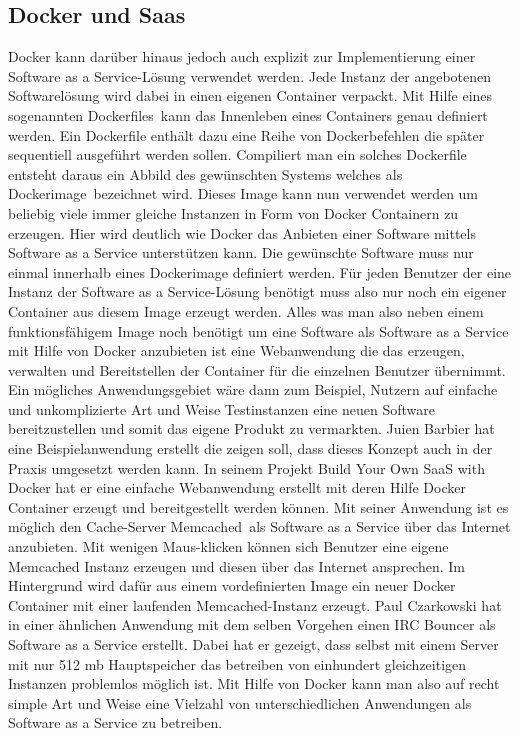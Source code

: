 \subsection{Docker und Saas}
\label{sec:docker_und_saas}
Docker kann darüber hinaus jedoch auch explizit zur Implementierung einer Software as a Service-Lösung verwendet werden. Jede Instanz der angebotenen Softwarelösung wird dabei in einen eigenen Container verpackt. Mit Hilfe eines sogenannten \grq Dockerfiles\grq\ kann das Innenleben eines Containers genau definiert werden. Ein Dockerfile enthält dazu eine Reihe von Dockerbefehlen die später sequentiell ausgeführt werden sollen. Compiliert man ein solches Dockerfile entsteht daraus ein Abbild des gewünschten Systems welches als \grq Dockerimage\grq\ bezeichnet wird.
Dieses Image kann nun verwendet werden um beliebig viele immer gleiche Instanzen in Form von Docker Containern zu erzeugen.
Hier wird deutlich wie Docker das Anbieten einer Software mittels Software as a Service unterstützen kann.
Die gewünschte Software muss nur einmal innerhalb eines Dockerimage definiert werden. Für jeden Benutzer der eine Instanz der Software as a Service-Lösung benötigt muss also nur noch ein eigener Container aus diesem Image erzeugt werden. Alles was man also neben einem funktionsfähigem Image noch benötigt um eine Software als Software as a Service mit Hilfe von Docker anzubieten ist eine Webanwendung die das erzeugen, verwalten und Bereitstellen der Container für die einzelnen Benutzer übernimmt.
Ein mögliches Anwendungsgebiet wäre dann zum Beispiel, Nutzern auf einfache und unkomplizierte Art und Weise Testinstanzen eine neuen Software bereitzustellen und somit das eigene Produkt zu vermarkten.
Juien Barbier hat eine Beispielanwendung erstellt die zeigen soll, dass dieses Konzept auch in der Praxis umgesetzt werden kann.
In seinem Projekt \glqq Build Your Own SaaS with Docker\grqq \cite{barbier_build_2013} hat er eine einfache Webanwendung erstellt mit deren Hilfe Docker Container erzeugt und bereitgestellt werden können. Mit seiner Anwendung ist es möglich den Cache-Server \grq Memcached\grq\ als Software as a Service über das Internet anzubieten. Mit wenigen Maus-klicken können sich Benutzer eine eigene Memcached Instanz erzeugen und diesen über das Internet ansprechen.
Im Hintergrund wird dafür aus einem vordefinierten Image ein neuer Docker Container mit einer laufenden Memcached-Instanz erzeugt.
Paul Czarkowski hat in einer ähnlichen Anwendung mit dem selben Vorgehen einen  IRC Bouncer als Software as a Service erstellt. Dabei hat er gezeigt, dass selbst mit einem Server mit nur 512 mb Hauptspeicher das betreiben von einhundert gleichzeitigen Instanzen problemlos möglich ist. \cite{czarkowski_i_2014}
Mit Hilfe von Docker kann man also auf recht simple Art und Weise eine Vielzahl von unterschiedlichen Anwendungen als Software as a Service zu betreiben.

